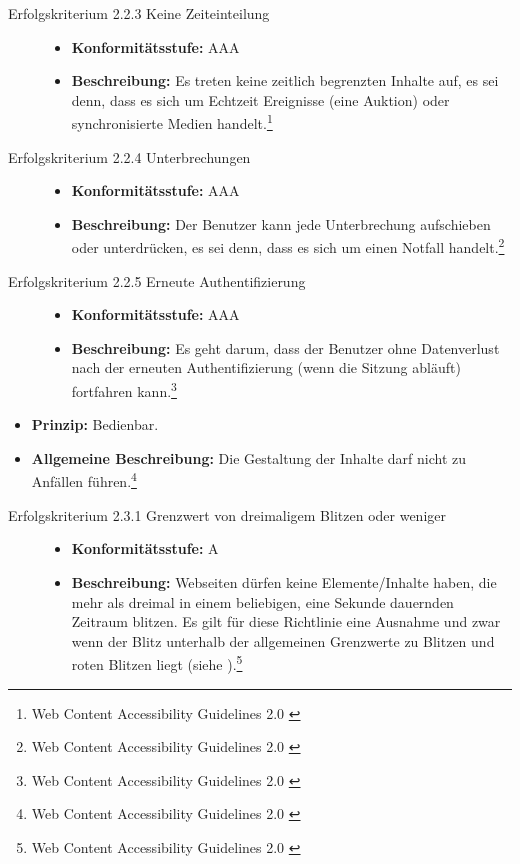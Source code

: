 \begin{description}
\begin{description}
		\item[Erfolgskriterium 2.2.3 Keine Zeiteinteilung]\hfill
		\begin{itemize}
			\item \textbf{Konformitätsstufe:} AAA
			\item \textbf{Beschreibung:} Es treten keine zeitlich begrenzten Inhalte auf, es sei denn, dass es sich um Echtzeit Ereignisse (eine Auktion) oder  
			synchronisierte Medien handelt.\footnote{Web Content Accessibility Guidelines 2.0 \cite{WCAG2.0}}
		\end{itemize}
		
		\item[Erfolgskriterium 2.2.4 Unterbrechungen]\hfill
		\begin{itemize}
			\item \textbf{Konformitätsstufe:} AAA
			\item \textbf{Beschreibung:} Der Benutzer kann jede Unterbrechung aufschieben oder unterdrücken, es sei denn, dass es sich um einen Notfall 
			handelt.\footnote{Web Content Accessibility Guidelines 2.0 \cite{WCAG2.0}}
		\end{itemize}
		
		\item[Erfolgskriterium 2.2.5 Erneute Authentifizierung]\hfill
		\begin{itemize}
			\item \textbf{Konformitätsstufe:} AAA
			\item \textbf{Beschreibung:} Es geht darum, dass der Benutzer ohne Datenverlust nach der erneuten Authentifizierung (wenn die Sitzung abläuft) 
			fortfahren kann.\footnote{Web Content Accessibility Guidelines 2.0 \cite{WCAG2.0}}
		\end{itemize}
	\end{description}
	
	\item [Richtlinie 2.3 Anfälle]\hfill
	\begin{itemize}
		\item \textbf{Prinzip:} Bedienbar.
		\item \textbf{Allgemeine Beschreibung:} Die Gestaltung der Inhalte darf nicht zu Anfällen führen.\footnote{Web Content Accessibility Guidelines 2.0 \cite{WCAG2.0}}
	\end{itemize}
	
	\begin{description}
		\item[Erfolgskriterium 2.3.1 Grenzwert von dreimaligem Blitzen oder weniger]\hfill
		\begin{itemize}
			\item \textbf{Konformitätsstufe:} A
			\item \textbf{Beschreibung:} Webseiten dürfen keine Elemente/Inhalte haben, die mehr als dreimal in einem beliebigen, eine Sekunde dauernden Zeitraum 
			blitzen. Es gilt für diese Richtlinie eine Ausnahme und zwar wenn der Blitz unterhalb der allgemeinen Grenzwerte zu Blitzen und roten Blitzen liegt
			(siehe ).\footnote{Web Content Accessibility Guidelines 2.0 \cite{WCAG2.0}}
		\end{itemize}
		

\end{description}
\end{description}
